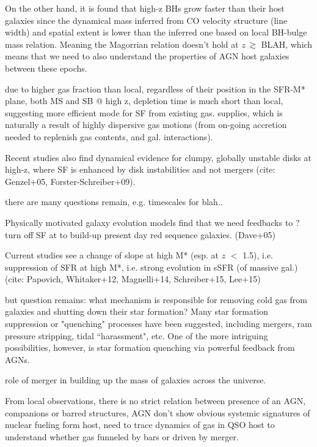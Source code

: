 \documentclass[]{emulateapj}
\begin{document}
On the other hand, it is found that high-z BHs grow faster than their host galaxies since the dynamical mass inferred from CO velocity structure (line width) and spatial extent is lower than the inferred one based on local BH-bulge mass relation.
Meaning the Magorrian relation doesn't hold at $z$\,$\gtrsim$ BLAH, which means that we need to also understand the 
properties of AGN host galaxies between these epochs.

due to higher gas fraction than local, regardless of their position in the SFR-M* plane, both MS and SB @ high z, depletion time is much short than local, suggesting more efficient mode for SF from existing gas.
supplies, which is naturally a result of highly dispersive gas motions (from on-going accretion needed to replenish gas 
contents, and gal. interactions).

Recent studies also find dynamical evidence for clumpy, globally unstable disks at high-z, 
where SF is enhanced by disk instabilities and not mergers (cite: Genzel+05, Forster-Schreiber+09).

there are many questions remain, e.g. timescales for blah..

Physically motivated galaxy evolution models find that we need feedbacks to ? turn off SF at to build-up present day red 
sequence galaxies. (Dave+05)

Current studies see a change of slope at high M* (esp. at $z$ $<$ 1.5),  i.e. suppression of SFR at high M*, i.e. strong evolution in 
sSFR (of massive gal.) (cite: Papovich, Whitaker+12, Magnelli+14, Schreiber+15, Lee+15)

but question remains: what mechanism is responsible for removing cold gas from galaxies and shutting down their star 
formation? Many star formation suppression or "quenching" processes have been suggested, including mergers, ram 
pressure stripping, tidal ``harassment", etc. One of the more intriguing possibilities, however, is star 
formation quenching via powerful feedback from AGNs.

role of merger in building up the mass of galaxies across the universe.

From local observations, there is no strict relation between presence of an AGN, companions or barred structures, AGN don't 
show obvious systemic signatures of nuclear fueling form host, need to trace dynamics of gas in QSO host to understand 
whether gas funneled by bars or driven by merger.
   
\end{document}
